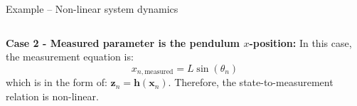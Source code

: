 \begin{frame}{Example – Non-linear system dynamics}
\begin{columns}
\textbf{Case 2 - Measured parameter is the pendulum $x$-position:} In this case, the measurement equation is:
\vspace{-8pt}
\[
x_{n,\text{measured}} = L\sin(\theta_n)
\]
which is in the form of: $\mathbf{z}_n = \mathbf{h}(\mathbf{x}_n)$. Therefore, the state-to-measurement relation is non-linear.

\end{columns}
\end{frame}
